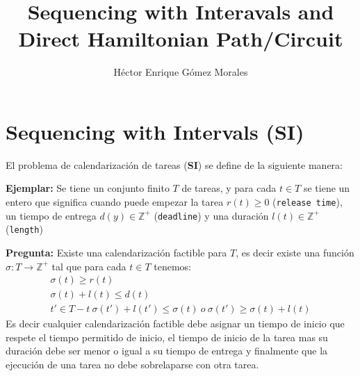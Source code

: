 \documentclass{article}
\author{Héctor Enrique Gómez Morales}
\title{Sequencing with Interavals and Direct Hamiltonian Path/Circuit}
\begin{document}
\maketitle
\section{Sequencing with Intervals (SI)}
El problema de calendarización de tareas (\textbf{SI}) se define de la siguiente manera:

\textbf{Ejemplar:} Se tiene un conjunto finito $T$ de tareas, y para cada $t \in T$
se tiene un entero que significa cuando puede empezar la tarea $r(t) \geq 0$ (\texttt{release time}), un tiempo de entrega $d(y) \in \mathbb{Z}^{+}$ (\texttt{deadline}) y una duración $l(t) \in \mathbb{Z}^{+}$ (\texttt{length})

\textbf{Pregunta:} Existe una calendarización factible para $T$, es decir existe una función $\sigma : T \rightarrow \mathbb{Z}^{+}$ tal que para cada $t \in T$ tenemos:
\begin{equation*}
  \begin{split}
    \sigma(t) \geq r(t)\\
    \sigma(t) + l(t) \leqslant d(t)\\
    t' \in T - {t}\ \sigma(t') + l(t') \leqslant \sigma(t)\ o\ \sigma(t') \geq \sigma(t) + l(t)
  \end{split}
\end{equation*}
Es decir cualquier calendarización factible debe asignar un tiempo de inicio que respete el tiempo permitido de inicio, el tiempo de inicio de la tarea mas su duración debe ser menor o igual a su tiempo de entrega y finalmente que la ejecución de una tarea no debe sobrelaparse con otra tarea.
\end{document}
